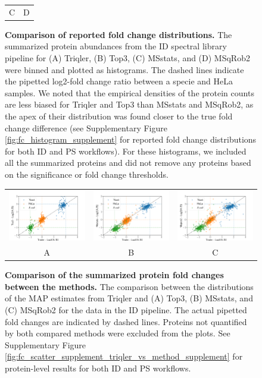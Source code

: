 \documentclass[10pt,letterpaper]{article}
\begin{document}
\begin{figure}[hbt]
\begin{tabular}{cc}
        C & D 
    \end{tabular}
    \caption{{\bf Comparison of reported fold change distributions.} The summarized protein abundances from the ID spectral library pipeline for (A) Triqler, (B) Top3, (C) MSstats, and (D) MSqRob2 were binned and plotted as histograms. The dashed lines indicate the pipetted log2-fold change ratio between a specie and HeLa samples. We noted that the empirical densities of the protein counts are less biased for Triqler and Top3 than MSstats and MSqRob2, as the apex of their distribution was found closer to the true fold change difference (see Supplementary Figure \ref{fig:fc_histogram_supplement} for reported fold change distributions for both ID and PS workflows). For these histograms, we included all the summarized proteins and did not remove any proteins based on  the significance or fold change thresholds. \label{fig:fc_histogram}}
\end{figure}


\begin{figure}[hbt]
    \centering
    \begin{tabular}{ccc}
        \includegraphics[width=0.33\linewidth]{../../result/report_plots_pipeline/scatter_ID_triqler_vs_top3.png} & 
        \includegraphics[width=0.33\linewidth]{../../result/report_plots_pipeline/scatter_ID_triqler_vs_msstats.png} & 
        \includegraphics[width=0.33\linewidth]{../../result/report_plots_pipeline/scatter_ID_triqler_vs_msqrob2.png} \\
        A & B & C
    \end{tabular}
    \caption{{\bf Comparison of the summarized protein fold changes between the methods.} The comparison between the distributions of the MAP estimates from Triqler and (A) Top3, (B) MSstats, and (C) MSqRob2 for the data in the ID pipeline. The actual pipetted fold changes are indicated by dashed lines. Proteins not quantified by both compared methods were excluded from the plots. See Supplementary Figure \ref{fig:fc_scatter_supplement_triqler_vs_method_supplement} for protein-level results for both ID and PS workflows. \label{fig:fc_scatter}}
\end{figure}
\end{document}
